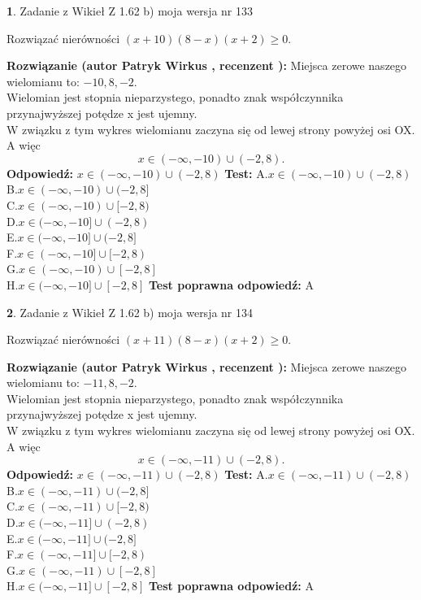\documentclass[12pt, a4paper]{article}
\theoremstyle{definition} %
\newtheorem{zad}{}
\newcommand{\zadStart}[1]{\begin{zad}#1\newline}
\newcommand{\zadStop}{\end{zad}}
\newcommand{\rozwStart}[2]{\noindent \textbf{Rozwiązanie (autor #1 , recenzent #2): }\newline}
\newcommand{\rozwStop}{\newline}
\newcommand{\odpStart}{\noindent \textbf{Odpowiedź:}\newline}
\newcommand{\odpStop}{\newline}
\newcommand{\testStart}{\noindent \textbf{Test:}\newline}
\newcommand{\testStop}{\newline}
\newcommand{\kluczStart}{\noindent \textbf{Test poprawna odpowiedź:}\newline}
\newcommand{\kluczStop}{\newline}
\begin{document}
\zadStart{Zadanie z Wikieł Z 1.62 b) moja wersja nr 133}

Rozwiązać nierówności $(x+10)(8-x)(x+2)\ge0$.
\zadStop
\rozwStart{Patryk Wirkus}{}
Miejsca zerowe naszego wielomianu to: $-10, 8, -2$.\\
Wielomian jest stopnia nieparzystego, ponadto znak współczynnika przy\linebreak najwyższej potędze x jest ujemny.\\ W związku z tym wykres wielomianu zaczyna się od lewej strony powyżej osi OX. A więc $$x \in (-\infty,-10) \cup (-2,8).$$
\rozwStop
\odpStart
$x \in (-\infty,-10) \cup (-2,8)$
\odpStop
\testStart
A.$x \in (-\infty,-10) \cup (-2,8)$\\
B.$x \in (-\infty,-10) \cup (-2,8]$\\
C.$x \in (-\infty,-10) \cup [-2,8)$\\
D.$x \in (-\infty,-10] \cup (-2,8)$\\
E.$x \in (-\infty,-10] \cup (-2,8]$\\
F.$x \in (-\infty,-10] \cup [-2,8)$\\
G.$x \in (-\infty,-10) \cup [-2,8]$\\
H.$x \in (-\infty,-10] \cup [-2,8]$
\testStop
\kluczStart
A
\kluczStop



\zadStart{Zadanie z Wikieł Z 1.62 b) moja wersja nr 134}

Rozwiązać nierówności $(x+11)(8-x)(x+2)\ge0$.
\zadStop
\rozwStart{Patryk Wirkus}{}
Miejsca zerowe naszego wielomianu to: $-11, 8, -2$.\\
Wielomian jest stopnia nieparzystego, ponadto znak współczynnika przy\linebreak najwyższej potędze x jest ujemny.\\ W związku z tym wykres wielomianu zaczyna się od lewej strony powyżej osi OX. A więc $$x \in (-\infty,-11) \cup (-2,8).$$
\rozwStop
\odpStart
$x \in (-\infty,-11) \cup (-2,8)$
\odpStop
\testStart
A.$x \in (-\infty,-11) \cup (-2,8)$\\
B.$x \in (-\infty,-11) \cup (-2,8]$\\
C.$x \in (-\infty,-11) \cup [-2,8)$\\
D.$x \in (-\infty,-11] \cup (-2,8)$\\
E.$x \in (-\infty,-11] \cup (-2,8]$\\
F.$x \in (-\infty,-11] \cup [-2,8)$\\
G.$x \in (-\infty,-11) \cup [-2,8]$\\
H.$x \in (-\infty,-11] \cup [-2,8]$
\testStop
\kluczStart
A
\kluczStop
\end{document}
